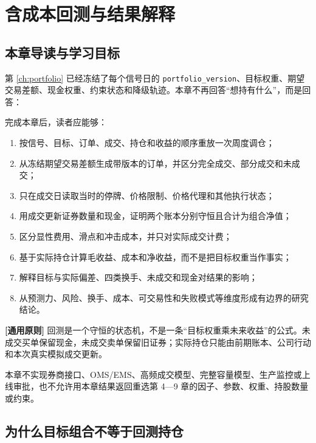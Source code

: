 \chapter{含成本回测与结果解释}
\label{ch:backtest}

\section{本章导读与学习目标}

第 \cref{ch:portfolio} 已经冻结了每个信号日的 \texttt{portfolio\_version}、目标权重、期望交易差额、现金权重、约束状态和降级轨迹。本章不再回答“想持有什么”，而是回答：

完成本章后，读者应能够：

\begin{enumerate}
  \item 按信号、目标、订单、成交、持仓和收益的顺序重放一次周度调仓；
  \item 从冻结期望交易差额生成带版本的订单，并区分完全成交、部分成交和未成交；
  \item 只在成交日读取当时的停牌、价格限制、价格代理和其他执行状态；
  \item 用成交更新证券数量和现金，证明两个账本分别守恒且合计为组合净值；
  \item 区分显性费用、滑点和冲击成本，并只对实际成交计费；
  \item 基于实际持仓计算毛收益、成本和净收益，而不是把目标权重当作事实；
  \item 解释目标与实际偏差、四类换手、未成交和现金对结果的影响；
  \item 从预测力、风险、换手、成本、可交易性和失败模式等维度形成有边界的研究结论。
\end{enumerate}

\begin{principlebox}
\textbf{[通用原则]} 回测是一个守恒的状态机，不是一条“目标权重乘未来收益”的公式。未成交买单保留现金，未成交卖单保留旧证券；实际持仓只能由前期账本、公司行动和本次真实模拟成交更新。
\end{principlebox}

本章不实现券商接口、OMS/EMS、高频成交模型、完整容量模型、生产监控或上线审批，也不允许用本章结果返回重选第 4---9 章的因子、参数、权重、持股数量或约束。

\section{为什么目标组合不等于回测持仓}

